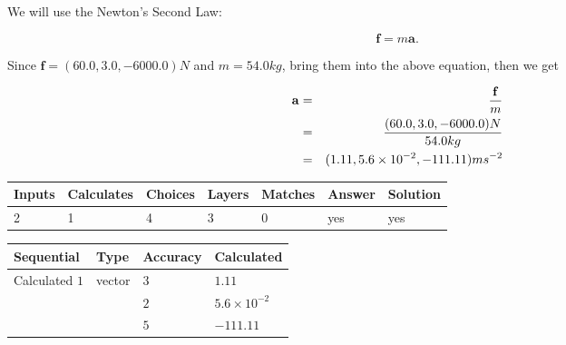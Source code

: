 \documentclass[12pt]{article}
\begin{document}
\noindent{}
 
 

We will use the Newton's Second Law:
 
\[
\mathbf{f}=m\mathbf{a}.
\]
 
Since $\mathbf{f}= %
(60.0 , 3.0 , -6000.0) N$
and $m= %
54.0kg$, bring them into the above equation, then we get
 
\begin{eqnarray*}
\mathbf{a}&=&\frac{\mathbf{f}}m  \\
&=&\frac{ %
(60.0 , 3.0 , -6000.0) N}{ %
54.0kg}  \\
&=& %
(1.11 , 5.6 \times 10^{-2} , -111.11) ms^{-2}
\end{eqnarray*}
 
 
 
\noindent{}
 
 

 
 
\vspace{0.3in}
   
   
   
   
\noindent\begin{tabular}{|l|l|l|l|l|l|l|}
 \hline
Inputs & Calculates & Choices & Layers & Matches & Answer & Solution \\ \hline
           2  & 
           1  & 
           4
  & 
           3  & 
           0  & 
  yes & 
  yes 
  \\ \hline
 \end{tabular}
   
   
   
   
\noindent{}
   
   
  
  
\noindent\begin{tabular}{|l|l|l|l|}
\hline
 Sequential & Type & Accuracy & Calculated \\ 
\hline
 
 
  Calculated $            1 $ & vector &  
  $            3  $ 
 &  $ 1.11 $ 
 \\    
  & & 
  $            2  $ 
 &  $ 5.6 \times 10^{-2} $ 
 \\    
  & & 
  $            5  $ 
 &  $ -111.11 $ 
 \\  \hline  
 \end{tabular}
   
\end{document}
